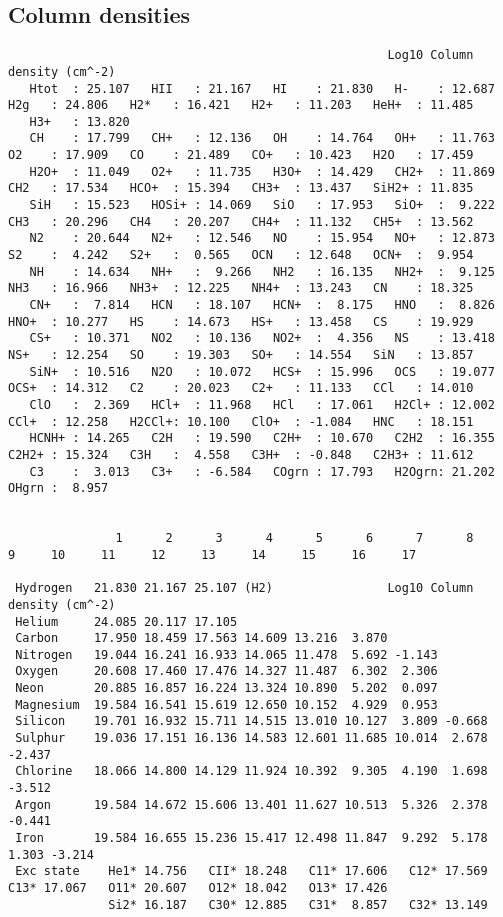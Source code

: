   \subsection{Column densities}
{\setverbatimfontsize{\tiny}
\begin{verbatim}
                                                     Log10 Column density (cm^-2)
   Htot  : 25.107   HII   : 21.167   HI    : 21.830   H-    : 12.687   H2g   : 24.806   H2*   : 16.421   H2+   : 11.203   HeH+  : 11.485
   H3+   : 13.820
   CH    : 17.799   CH+   : 12.136   OH    : 14.764   OH+   : 11.763   O2    : 17.909   CO    : 21.489   CO+   : 10.423   H2O   : 17.459
   H2O+  : 11.049   O2+   : 11.735   H3O+  : 14.429   CH2+  : 11.869   CH2   : 17.534   HCO+  : 15.394   CH3+  : 13.437   SiH2+ : 11.835
   SiH   : 15.523   HOSi+ : 14.069   SiO   : 17.953   SiO+  :  9.222   CH3   : 20.296   CH4   : 20.207   CH4+  : 11.132   CH5+  : 13.562
   N2    : 20.644   N2+   : 12.546   NO    : 15.954   NO+   : 12.873   S2    :  4.242   S2+   :  0.565   OCN   : 12.648   OCN+  :  9.954
   NH    : 14.634   NH+   :  9.266   NH2   : 16.135   NH2+  :  9.125   NH3   : 16.966   NH3+  : 12.225   NH4+  : 13.243   CN    : 18.325
   CN+   :  7.814   HCN   : 18.107   HCN+  :  8.175   HNO   :  8.826   HNO+  : 10.277   HS    : 14.673   HS+   : 13.458   CS    : 19.929
   CS+   : 10.371   NO2   : 10.136   NO2+  :  4.356   NS    : 13.418   NS+   : 12.254   SO    : 19.303   SO+   : 14.554   SiN   : 13.857
   SiN+  : 10.516   N2O   : 10.072   HCS+  : 15.996   OCS   : 19.077   OCS+  : 14.312   C2    : 20.023   C2+   : 11.133   CCl   : 14.010
   ClO   :  2.369   HCl+  : 11.968   HCl   : 17.061   H2Cl+ : 12.002   CCl+  : 12.258   H2CCl+: 10.100   ClO+  : -1.084   HNC   : 18.151
   HCNH+ : 14.265   C2H   : 19.590   C2H+  : 10.670   C2H2  : 16.355   C2H2+ : 15.324   C3H   :  4.558   C3H+  : -0.848   C2H3+ : 11.612
   C3    :  3.013   C3+   : -6.584   COgrn : 17.793   H2Ogrn: 21.202   OHgrn :  8.957


               1      2      3      4      5      6      7      8      9     10     11     12     13     14     15     16     17

 Hydrogen   21.830 21.167 25.107 (H2)                Log10 Column density (cm^-2)
 Helium     24.085 20.117 17.105
 Carbon     17.950 18.459 17.563 14.609 13.216  3.870
 Nitrogen   19.044 16.241 16.933 14.065 11.478  5.692 -1.143
 Oxygen     20.608 17.460 17.476 14.327 11.487  6.302  2.306
 Neon       20.885 16.857 16.224 13.324 10.890  5.202  0.097
 Magnesium  19.584 16.541 15.619 12.650 10.152  4.929  0.953
 Silicon    19.701 16.932 15.711 14.515 13.010 10.127  3.809 -0.668
 Sulphur    19.036 17.151 16.136 14.583 12.601 11.685 10.014  2.678 -2.437
 Chlorine   18.066 14.800 14.129 11.924 10.392  9.305  4.190  1.698 -3.512
 Argon      19.584 14.672 15.606 13.401 11.627 10.513  5.326  2.378 -0.441
 Iron       19.584 16.655 15.236 15.417 12.498 11.847  9.292  5.178  1.303 -3.214
 Exc state    He1* 14.756   CII* 18.248   C11* 17.606   C12* 17.569   C13* 17.067   O11* 20.607   O12* 18.042   O13* 17.426
              Si2* 16.187   C30* 12.885   C31*  8.857   C32* 13.149
\end{verbatim}
}

